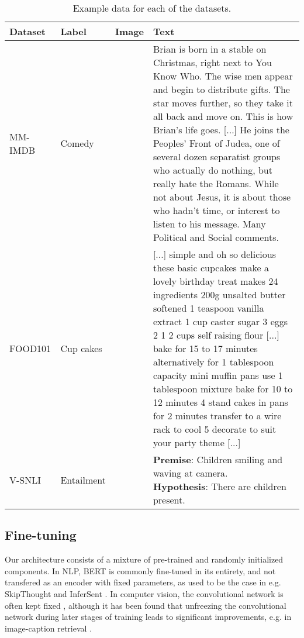\documentclass[11pt,a4paper]{article}
\begin{document}
\begin{table*}[t]
    \centering
    \small
    \renewcommand\arraystretch{1.1}
    \begin{tabular}{p{2cm}p{1.5cm}p{1.5cm}p{9.5cm}}
        \toprule
        \textbf{Dataset} & \textbf{Label} & \textbf{Image} & \textbf{Text}\\
        \midrule
         MM-IMDB & Comedy & \raisebox{-.9\height}{\texttt{[image: images/brian]}} & Brian is born in a stable on Christmas, right next to You Know Who. The wise men appear and begin to distribute gifts. The star moves further, so they take it all back and move on. This is how Brian's life goes. [...] He joins the Peoples' Front of Judea, one of several dozen separatist groups who actually do nothing, but really hate the Romans. While not about Jesus, it is about those who hadn't time, or interest to listen to his message. Many Political and Social comments.\\\midrule
         FOOD101 & Cup cakes & \raisebox{-.9\height}{\texttt{[image: images/cup\_cake]}} & [...] simple and oh so delicious these basic cupcakes make a lovely birthday treat makes 24 ingredients 200g unsalted butter softened 1 teaspoon vanilla extract 1 cup caster sugar 3 eggs 2 1 2 cups self raising flour [...] bake for 15 to 17 minutes alternatively for 1 tablespoon capacity mini muffin pans use 1 tablespoon mixture bake for 10 to 12 minutes 4 stand cakes in pans for 2 minutes transfer to a wire rack to cool 5 decorate to suit your party theme [...]\\\midrule
         V-SNLI & Entailment & \raisebox{-.85\height}{\texttt{[image: images/children]}} & \pbox{8cm}{\textbf{Premise}: Children smiling and waving at camera.\\\textbf{Hypothesis}: There are children present.} \\\bottomrule
    \end{tabular}
    \caption{Example data for each of the datasets.}
    \label{tab:examples}
\end{table*}

\subsection{Fine-tuning}

Our architecture consists of a mixture of pre-trained and randomly initialized components. In NLP, BERT is commonly fine-tuned in its entirety, and not transfered as an encoder with fixed parameters, as used to be the case in e.g. SkipThought \cite{Kiros:2015nips} and InferSent \cite{Conneau:2017emnlp}. In computer vision, the convolutional network is often kept fixed \cite{Razavian:2014cvpr}, although it has been found that unfreezing the convolutional network during later stages of training leads to significant improvements, e.g. in image-caption retrieval \cite{Faghri:2017arxiv}.
\end{document}
